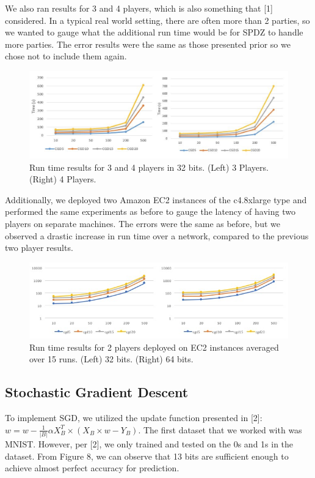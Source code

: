 \documentclass{article}
\theoremstyle{plain}
\theoremstyle{definition}
\theoremstyle{remark}
\begin{document}
We also ran results for 3 and 4 players, which is also something that [1] considered. In a typical real world setting, there are often more than 2 parties, so we wanted to gauge what the additional run time would be for SPDZ to handle more parties. The error results were the same as those presented prior so we chose not to include them again. 

\begin{figure}[h]
\centering
  \includegraphics[scale=0.6]{multi.jpg}
  \caption{Run time results for 3 and 4 players in 32 bits. (Left) 3 Players. (Right) 4 Players.}
  \label{fig:result4}
\end{figure}

\noindent
Additionally, we deployed two Amazon EC2 instances of the c4.8xlarge type and performed the same experiments as before to gauge the latency of having two players on separate machines. The errors were the same as before, but we observed a drastic increase in run time over a network, compared to the previous two player results. 

\begin{figure}[h]
\centering
  \includegraphics[scale=0.7]{ec2.jpg}
  \caption{Run time results for 2 players deployed on EC2 instances averaged over 15 runs. (Left) 32 bits. (Right) 64 bits.}
  \label{fig:result4}
\end{figure}

\subsection{Stochastic Gradient Descent}

To implement SGD, we utilized the update function presented in [2]: $ w = w - \frac{1}{|B|} \alpha X^{T}_{B} \times (X_{B} \times w - Y_{B})$. The first dataset that we worked with was MNIST. However, per [2], we only trained and tested on the 0s and 1s in the dataset. From Figure 8, we can observe that 13 bits are sufficient enough to achieve almost perfect accuracy for prediction.
\end{document}
